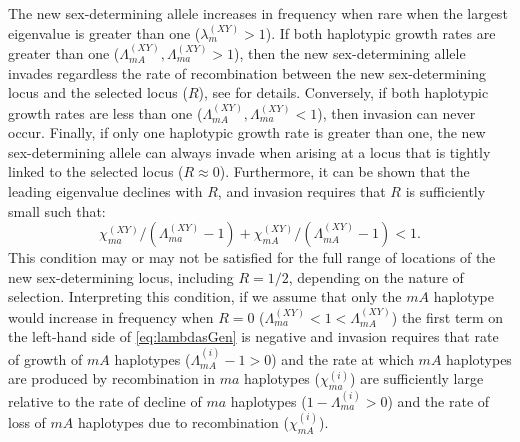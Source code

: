 \documentclass[10pt,letterpaper]{article}
\begin{document}
The new sex-determining allele increases in frequency when rare when the largest eigenvalue is greater than one ($\lambda_m^{(XY)}>1$). 
If both haplotypic growth rates are greater than one ($\Lambda_{mA}^{(XY)}, \Lambda_{ma}^{(XY)}>1$), then the new sex-determining allele invades regardless the rate of recombination between the new sex-determining locus and the selected locus ($R$), see  for details.
Conversely, if both haplotypic growth rates are less than one ($\Lambda_{mA}^{(XY)}, \Lambda_{ma}^{(XY)}<1$), then invasion can never occur.  
Finally, if only one haplotypic growth rate is greater than one, the new sex-determining allele can always invade when arising at a locus that is tightly linked to the selected locus ($R\approx0$).  
Furthermore, it can be shown that the leading eigenvalue declines with $R$, and invasion requires that $R$ is sufficiently small such that: 
\begin{equation}\label{eq:lambdasGen}
\chi_{ma}^{(XY)}/\left(\Lambda_{ma}^{(XY)} - 1\right) + \chi_{mA}^{(XY)}/\left(\Lambda_{mA}^{(XY)} - 1\right) < 1.
\end{equation}
\noindent 
This condition may or may not be satisfied for the full range of locations of the new sex-determining locus, including $R=1/2$, depending on the nature of selection.  
Interpreting this condition, if we assume that only the $mA$ haplotype would increase in frequency when $R=0$ ($\Lambda_{ma}^{(XY)}<1<\Lambda_{mA}^{(XY)}$) the first term on the left-hand side of \eqref{eq:lambdasGen} is negative and invasion requires that rate of growth of $mA$ haplotypes ($\Lambda_{mA}^{(i)}-1>0$) and the rate at which $mA$ haplotypes are produced by recombination in $ma$ haplotypes ($\chi_{ma}^{(i)}$) are sufficiently large relative to the rate of decline of $ma$ haplotypes ($1-\Lambda_{ma}^{(i)}>0$) and the rate of loss of $mA$ haplotypes due to recombination ($\chi_{mA}^{(i)}$).
\end{document}
